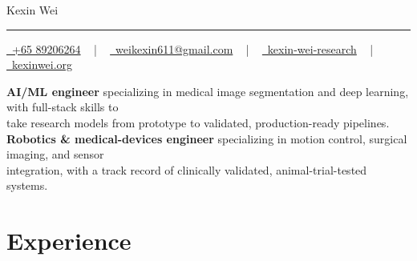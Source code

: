 \documentclass[a4paper,10pt]{article}
\newif\ifaimlver
\newif\ifallver
\begin{document}
\begin{center}
  \begin{center}
    {\Huge\color{UI_blue} Kexin Wei}
    \vspace{12pt}
    {\color{UI_blue} \hrule}
    \vspace{2pt}
    \vspace{2pt}
    \href{tel:+6589206264}{
      \raisebox{-0.05\height} \faPhone\ +65 89206264} ~ | ~
    \href{mailto:weikexin611@gmail.com}{
      \raisebox{-0.15\height} \faEnvelope\ weikexin611@gmail.com} ~ | ~
    \href{https://www.linkedin.com/in/kexin-wei-research/}{
      \raisebox{-0.15\height} \faLinkedin\ kexin-wei-research} ~ | ~
    \href{https://kexinwei.org/}{
    \raisebox{-0.15\height} \faGlobe\ kexinwei.org    }
      
  \end{center}

\vspace{-0.15cm} 
{\color{UI_blue} \hrulefill}
\end{center}
\begin{center}
\ifallver
\textbf{AI, robotics, and cybersecurity engineer} with expertise in full-stack development and team leadership. \\
Strong focus on system architecture, quality control, and cross-functional collaboration.
\else\ifaimlver
\textbf{AI/ML engineer} specializing in medical image segmentation and deep learning, with full-stack skills to \\
take research models from prototype to validated, production-ready pipelines.
\else
\textbf{Robotics \& medical-devices engineer} specializing in motion control, surgical imaging, and sensor \\
integration, with a track record of clinically validated, animal-trial-tested systems.
\fi\fi
\end{center}

\section{Experience}
\end{document}
